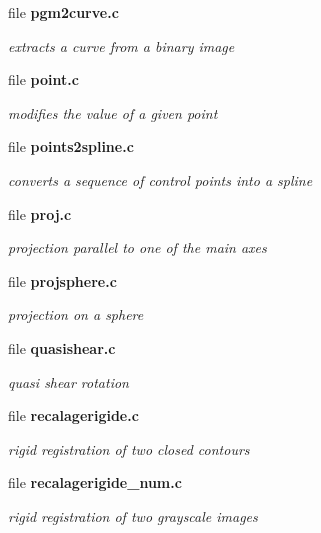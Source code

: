 \begin{CompactItemize}
\item 
file {\bf pgm2curve.c}
\begin{CompactList}\small\item\em extracts a curve from a binary image \item\end{CompactList}

\item 
file {\bf point.c}
\begin{CompactList}\small\item\em modifies the value of a given point \item\end{CompactList}

\item 
file {\bf points2spline.c}
\begin{CompactList}\small\item\em converts a sequence of control points into a spline \item\end{CompactList}

\item 
file {\bf proj.c}
\begin{CompactList}\small\item\em projection parallel to one of the main axes \item\end{CompactList}

\item 
file {\bf projsphere.c}
\begin{CompactList}\small\item\em projection on a sphere \item\end{CompactList}

\item 
file {\bf quasishear.c}
\begin{CompactList}\small\item\em quasi shear rotation \item\end{CompactList}

\item 
file {\bf recalagerigide.c}
\begin{CompactList}\small\item\em rigid registration of two closed contours \item\end{CompactList}

\item 
file {\bf recalagerigide\_\-num.c}
\begin{CompactList}\small\item\em rigid registration of two grayscale images \item\end{CompactList}


\end{CompactItemize}
